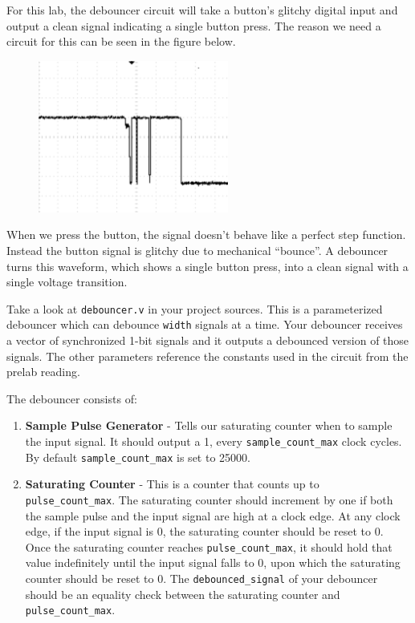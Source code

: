 \documentclass[11pt]{article}
\begin{document}
For this lab, the debouncer circuit will take a button's glitchy digital input and output a clean signal indicating a single button press. The reason we need a circuit for this can be seen in the figure below.

\begin{figure}[H]
	\centerline{\includegraphics[height=5cm]{figs/lab2_fig4.png}}
\end{figure}

When we press the button, the signal doesn't behave like a perfect step function. Instead the button signal is glitchy due to mechanical ``bounce''. A debouncer turns this waveform, which shows a single button press, into a clean signal with a single voltage transition.

Take a look at \verb|debouncer.v| in your project sources. This is a parameterized debouncer which can debounce \verb|width| signals at a time. Your debouncer receives a vector of synchronized 1-bit signals and it outputs a debounced version of those signals. The other parameters reference the constants used in the circuit from the prelab reading.

The debouncer consists of:

\begin{enumerate}
	\item \textbf{Sample Pulse Generator} - Tells our saturating counter when to sample the input signal. It should output a 1, every \verb|sample_count_max| clock cycles. By default \verb|sample_count_max| is set to 25000.
	\item \textbf{Saturating Counter} - This is a counter that counts up to \verb|pulse_count_max|. The saturating counter should increment by one if both the sample pulse and the input signal are high at a clock edge. At any clock edge, if the input signal is 0, the saturating counter should be reset to 0. Once the saturating counter reaches \verb|pulse_count_max|, it should hold that value indefinitely until the input signal falls to 0, upon which the saturating counter should be reset to 0. The \verb|debounced_signal| of your debouncer should be an equality check between the saturating counter and \verb|pulse_count_max|.
\end{enumerate}
\end{document}
